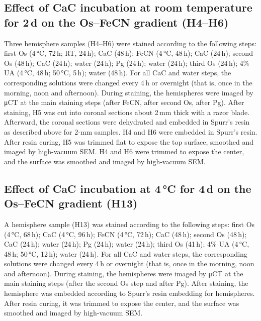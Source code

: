 \documentclass{article}
\begin{document}
\subsection*{Effect of CaC incubation at room temperature for 2\,d on the Os–FeCN gradient (H4–H6)}
Three hemisphere samples (H4–H6) were stained according to the following steps: first Os (4\,°C, 72\,h; RT, 24\,h); CaC (48\,h); FeCN (4\,°C, 48\,h); CaC (24\,h); second Os (48\,h); CaC (24\,h); water (24\,h); Pg (24\,h); water (24\,h); third Os (24\,h); 4\% UA (4\,°C, 48\,h; 50\,°C, 5\,h); water (48\,h). For all CaC and water steps, the corresponding solutions were changed every 4\,h or overnight (that is, once in the morning, noon and afternoon). During staining, the hemispheres were imaged by μCT at the main staining steps (after FeCN, after second Os, after Pg). After staining, H5 was cut into coronal sections about 2\,mm thick with a razor blade. Afterward, the coronal sections were dehydrated and embedded in Spurr’s resin as described above for 2-mm samples. H4 and H6 were embedded in Spurr’s resin. After resin curing, H5 was trimmed flat to expose the top surface, smoothed and imaged by high-vacuum SEM. H4 and H6 were trimmed to expose the center, and the surface was smoothed and imaged by high-vacuum SEM.

\subsection*{Effect of CaC incubation at 4\,°C for 4\,d on the Os–FeCN gradient (H13)}
A hemisphere sample (H13) was stained according to the following steps: first Os (4\,°C, 68\,h); CaC (4\,°C, 96\,h); FeCN (4\,°C, 72\,h); CaC (48\,h); second Os (48\,h); CaC (24\,h); water (24\,h); Pg (24\,h); water (24\,h); third Os (41\,h); 4\% UA (4\,°C, 48\,h; 50\,°C, 12\,h); water (24\,h). For all CaC and water steps, the corresponding solutions were changed every 4\,h or overnight (that is, once in the morning, noon and afternoon). During staining, the hemispheres were imaged by μCT at the main staining steps (after the second Os step and after Pg). After staining, the hemisphere was embedded according to Spurr’s resin embedding for hemispheres. After resin curing, it was trimmed to expose the center, and the surface was smoothed and imaged by high-vacuum SEM.
\end{document}
